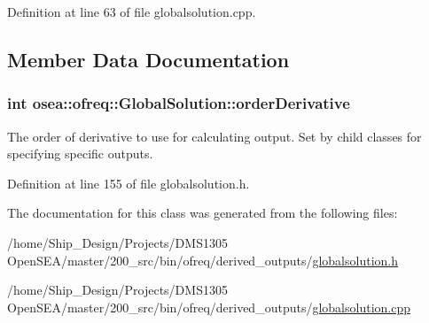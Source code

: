 Definition at line 63 of file globalsolution.\-cpp.



\subsection{Member Data Documentation}
\hypertarget{classosea_1_1ofreq_1_1_global_solution_a935843ad9f4fd2de2a2ec407de45a20d}{
\subsubsection[{order\-Derivative}]{\setlength{\rightskip}{0pt plus 5cm}int osea\-::ofreq\-::\-Global\-Solution\-::order\-Derivative\hspace{0.3cm}{\ttfamily [protected]}}}\label{classosea_1_1ofreq_1_1_global_solution_a935843ad9f4fd2de2a2ec407de45a20d}


The order of derivative to use for calculating output. Set by child classes for specifying specific outputs. 



Definition at line 155 of file globalsolution.\-h.



The documentation for this class was generated from the following files\-:\begin{DoxyCompactItemize}
\item 
/home/\-Ship\-\_\-\-Design/\-Projects/\-D\-M\-S1305 Open\-S\-E\-A/master/200\-\_\-src/bin/ofreq/derived\-\_\-outputs/\hyperlink{globalsolution_8h}{globalsolution.\-h}\item 
/home/\-Ship\-\_\-\-Design/\-Projects/\-D\-M\-S1305 Open\-S\-E\-A/master/200\-\_\-src/bin/ofreq/derived\-\_\-outputs/\hyperlink{globalsolution_8cpp}{globalsolution.\-cpp}\end{DoxyCompactItemize}
